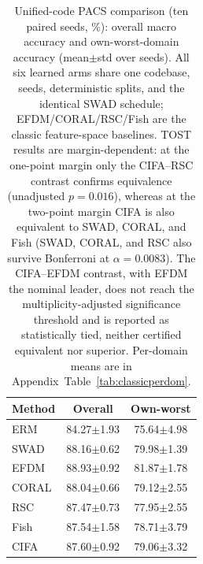 \documentclass[electronics,article,submit,moreauthors]{Definitions/mdpi}
\newcommand{\add}[1]{\textcolor{addblue}{#1}}
\newcommand{\del}[1]{\textcolor{delred}{\st{#1}}}
\def\add#1{#1}
\def\del#1{}
\begin{document}
\begin{table}[t]
\centering
\caption{Unified-code PACS comparison (ten paired seeds, \%): overall macro accuracy and own-worst-domain accuracy (mean$\pm$std over seeds). All six learned arms share one codebase, seeds, deterministic splits, and the identical SWAD schedule; EFDM/CORAL/RSC/Fish are the classic feature-space baselines. \del{Every arm is statistically equivalent to CIFA under TOST (one-point margin) after Bonferroni adjustment (\mbox{$\alpha=0.0083$}); EFDM is the nominal leader.}
\add{TOST results are margin-dependent: at the one-point margin only the CIFA--RSC contrast confirms equivalence (unadjusted $p=0.016$), whereas at the two-point margin CIFA is also equivalent to SWAD, CORAL, and Fish (SWAD, CORAL, and RSC also survive Bonferroni at $\alpha=0.0083$). The CIFA--EFDM contrast, with EFDM the nominal leader, does not reach the multiplicity-adjusted significance threshold and is reported as statistically tied, neither certified equivalent nor superior.} Per-domain means are in Appendix~Table~\ref{tab:classicperdom}.}
\label{tab:classic}
\setlength{\tabcolsep}{5pt}
\begin{tabular}{lcc}
\toprule
\textbf{Method} & \textbf{Overall} & \textbf{Own-worst}\\
\midrule
ERM   & 84.27$\pm$1.93 & 75.64$\pm$4.98 \\
SWAD  & 88.16$\pm$0.62 & 79.98$\pm$1.39 \\
EFDM  & 88.93$\pm$0.92 & 81.87$\pm$1.78 \\
CORAL & 88.04$\pm$0.66 & 79.12$\pm$2.55 \\
RSC   & 87.47$\pm$0.73 & 77.95$\pm$2.55 \\
Fish  & 87.54$\pm$1.58 & 78.71$\pm$3.79 \\
CIFA  & 87.60$\pm$0.92 & 79.06$\pm$3.32 \\
\bottomrule
\end{tabular}
\end{table}
\end{document}
